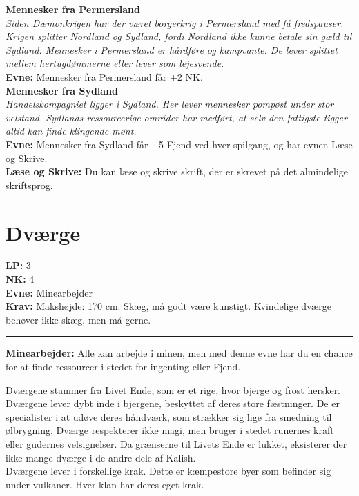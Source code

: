 \textbf{Mennesker fra Permersland}\\
\textit{Siden Dæmonkrigen har der været borgerkrig i Permersland med få fredspauser. Krigen splitter Nordland og Sydland, fordi Nordland ikke kunne betale sin gæld til Sydland. Mennesker i Permersland er hårdføre og kampvante. De lever splittet mellem hertugdømmerne eller lever som lejesvende.}\\
\textbf{Evne:} Mennesker fra Permersland får +2 NK.\\

\textbf{Mennesker fra Sydland}\\
\textit{Handelskompagniet ligger i Sydland. Her lever mennesker pompøst under stor velstand. Sydlands ressourcerige områder har medført, at selv den fattigste tigger altid kan finde klingende mønt.}\\
\textbf{Evne:} Mennesker fra Sydland får +5 Fjend ved hver spilgang, og har evnen Læse og Skrive.\\
\textbf{Læse og Skrive:} Du kan læse og skrive skrift, der er skrevet på det almindelige skriftsprog.\\




\section{Dværge}
\begin{race*}[Dværge]
\textbf{LP:} 3\\ 
\textbf{NK:} 4\\ 
\textbf{Evne:} Minearbejder\\
\textbf{Krav:} Makshøjde: 170 cm. Skæg, må godt være kunstigt. Kvindelige dværge behøver ikke skæg, men må gerne.\\
\rule{\textwidth}{0.4pt}
\textbf{Minearbejder:} Alle kan arbejde i minen, men med denne evne har du en chance for at finde ressourcer i stedet for ingenting eller Fjend.
\end{race*}

Dværgene stammer fra Livet Ende, som er et rige, hvor bjerge og frost hersker. Dværgene lever dybt inde i bjergene, beskyttet af deres store fæstninger. De er specialister i at udøve deres håndværk, som strækker sig lige fra smedning til ølbrygning. Dværge respekterer ikke magi, men bruger i stedet runernes kraft eller gudernes velsignelser. Da grænserne til Livets Ende er lukket, eksisterer der ikke mange dværge i de andre dele af Kalish.\\
Dværgene lever i forskellige krak. Dette er kæmpestore byer som befinder sig under vulkaner. Hver klan har deres eget krak.\\


